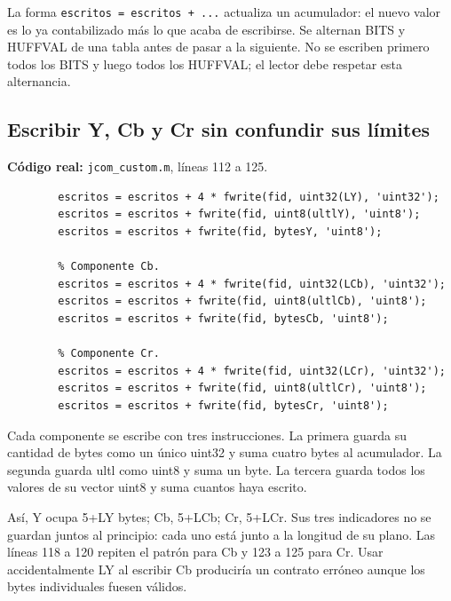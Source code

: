 \documentclass[11pt,a4paper,oneside]{report}
\begin{document}
La forma \texttt{escritos = escritos + ...} actualiza un acumulador: el nuevo
valor es lo ya contabilizado más lo que acaba de escribirse. Se alternan BITS
y HUFFVAL de una tabla antes de pasar a la siguiente. No se escriben primero
todos los BITS y luego todos los HUFFVAL; el lector debe respetar esta alternancia.


\par\medskip\noindent\begin{minipage}{\linewidth}

\subsection{Escribir Y, Cb y Cr sin confundir sus límites}

\textbf{Código real:} \texttt{jcom\_custom.m}, líneas 112 a 125.

\begin{lstlisting}[firstnumber=112]
        % Componente Y.
        escritos = escritos + 4 * fwrite(fid, uint32(LY), 'uint32');
        escritos = escritos + fwrite(fid, uint8(ultlY), 'uint8');
        escritos = escritos + fwrite(fid, bytesY, 'uint8');

        % Componente Cb.
        escritos = escritos + 4 * fwrite(fid, uint32(LCb), 'uint32');
        escritos = escritos + fwrite(fid, uint8(ultlCb), 'uint8');
        escritos = escritos + fwrite(fid, bytesCb, 'uint8');

        % Componente Cr.
        escritos = escritos + 4 * fwrite(fid, uint32(LCr), 'uint32');
        escritos = escritos + fwrite(fid, uint8(ultlCr), 'uint8');
        escritos = escritos + fwrite(fid, bytesCr, 'uint8');
\end{lstlisting}

\end{minipage}\par


Cada componente se escribe con tres instrucciones. La primera guarda su
cantidad de bytes como un único uint32 y suma cuatro bytes al acumulador.
La segunda guarda ultl como uint8 y suma un byte. La tercera guarda todos
los valores de su vector uint8 y suma cuantos haya escrito.

Así, Y ocupa 5+LY bytes; Cb, 5+LCb; Cr, 5+LCr. Sus tres indicadores no se
guardan juntos al principio: cada uno está junto a la longitud de su plano.
Las líneas 118 a 120 repiten el patrón para Cb y 123 a 125 para Cr. Usar
accidentalmente LY al escribir Cb produciría un contrato erróneo aunque los
bytes individuales fuesen válidos.
\end{document}
